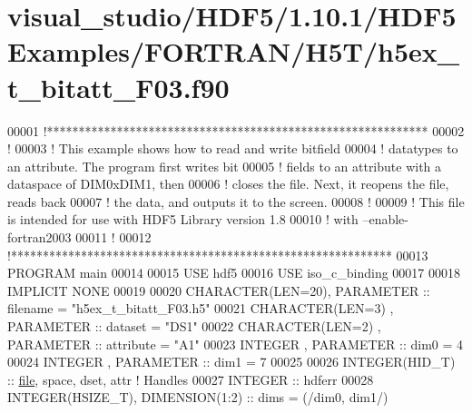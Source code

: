\hypertarget{visual__studio_2_h_d_f5_21_810_81_2_h_d_f5_examples_2_f_o_r_t_r_a_n_2_h5_t_2h5ex__t__bitatt___f03_8f90_source}{}\section{visual\+\_\+studio/\+H\+D\+F5/1.10.1/\+H\+D\+F5\+Examples/\+F\+O\+R\+T\+R\+A\+N/\+H5\+T/h5ex\+\_\+t\+\_\+bitatt\+\_\+\+F03.f90}
\label{visual__studio_2_h_d_f5_21_810_81_2_h_d_f5_examples_2_f_o_r_t_r_a_n_2_h5_t_2h5ex__t__bitatt___f03_8f90_source}

\begin{DoxyCode}
00001 \textcolor{comment}{!************************************************************}
00002 \textcolor{comment}{!}
00003 \textcolor{comment}{!  This example shows how to read and write bitfield}
00004 \textcolor{comment}{!  datatypes to an attribute.  The program first writes bit}
00005 \textcolor{comment}{!  fields to an attribute with a dataspace of DIM0xDIM1, then}
00006 \textcolor{comment}{!  closes the file.  Next, it reopens the file, reads back}
00007 \textcolor{comment}{!  the data, and outputs it to the screen.}
00008 \textcolor{comment}{!}
00009 \textcolor{comment}{!  This file is intended for use with HDF5 Library version 1.8}
00010 \textcolor{comment}{!  with --enable-fortran2003}
00011 \textcolor{comment}{!}
00012 \textcolor{comment}{!************************************************************}
00013 \textcolor{keyword}{PROGRAM} main
00014 
00015   \textcolor{keywordtype}{USE }hdf5
00016   \textcolor{keywordtype}{USE }iso\_c\_binding
00017   
00018   \textcolor{keywordtype}{IMPLICIT NONE}
00019 
00020   \textcolor{keywordtype}{CHARACTER(LEN=20)}, \textcolor{keywordtype}{PARAMETER} :: filename  = \textcolor{stringliteral}{"h5ex\_t\_bitatt\_F03.h5"}
00021   \textcolor{keywordtype}{CHARACTER(LEN=3)} , \textcolor{keywordtype}{PARAMETER} :: dataset   = \textcolor{stringliteral}{"DS1"}
00022   \textcolor{keywordtype}{CHARACTER(LEN=2)} , \textcolor{keywordtype}{PARAMETER} :: attribute = \textcolor{stringliteral}{"A1"}
00023   \textcolor{keywordtype}{INTEGER}          , \textcolor{keywordtype}{PARAMETER} :: dim0      = 4
00024   \textcolor{keywordtype}{INTEGER}          , \textcolor{keywordtype}{PARAMETER} :: dim1      = 7
00025 
00026   \textcolor{keywordtype}{INTEGER(HID\_T)}  :: \hyperlink{structfile}{file}, space, dset, attr \textcolor{comment}{! Handles}
00027   \textcolor{keywordtype}{INTEGER} :: hdferr
00028   \textcolor{keywordtype}{INTEGER(HSIZE\_T)}, \textcolor{keywordtype}{DIMENSION(1:2)}   :: dims = (/dim0, dim1/)

\end{DoxyCode}
